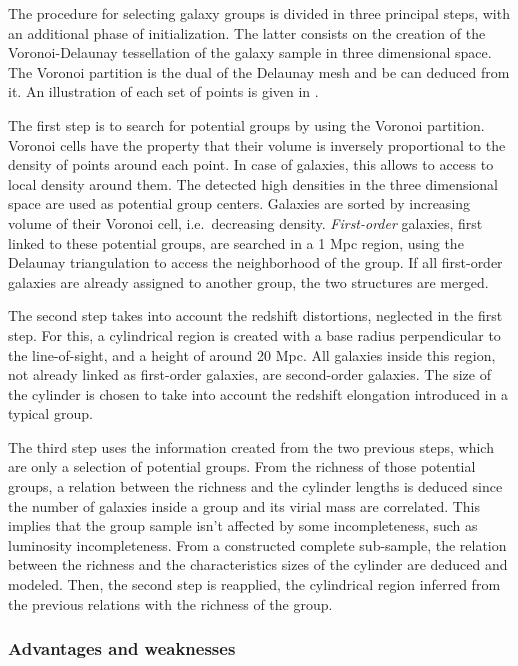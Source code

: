 The procedure for selecting galaxy groups is divided in three principal steps,
with an additional phase of initialization. The latter consists on the creation
of the Voronoi-Delaunay tessellation of the galaxy sample in three dimensional
space. The Voronoi partition is the dual of the Delaunay mesh and be can
deduced from it. An illustration of each set of points is given in
.

The first step is to search for potential groups by using the Voronoi
partition. Voronoi cells have the property that their volume is inversely
proportional to the density of points around each point. In case of galaxies,
this allows to access to local density around them. The detected high densities
in the three dimensional space are used as potential group centers. Galaxies
are sorted by increasing volume of their Voronoi cell, i.e.\ decreasing
density. \emph{First-order} galaxies, first linked to these potential groups,
are searched in a 1 Mpc region, using the Delaunay triangulation to access the
neighborhood of the group. If all first-order galaxies are already assigned to
another group, the two structures are merged.

The second step takes into account the redshift distortions, neglected in the
first step. For this, a cylindrical region is created with a base radius
perpendicular to the line-of-sight, and a height of around 20 Mpc. All galaxies
inside this region, not already linked as first-order galaxies, are
second-order galaxies. The size of the cylinder is chosen to take into account
the redshift elongation introduced in a typical group.

The third step uses the information created from the two previous steps, which
are only a selection of potential groups. From the richness of those potential
groups, a relation between the richness and the cylinder lengths is deduced
since the number of galaxies inside a group and its virial mass are correlated.
This implies that the group sample isn't affected by some incompleteness, such
as luminosity incompleteness. From a constructed complete sub-sample, the
relation between the richness and the characteristics sizes of the cylinder are
deduced and modeled. Then, the second step is reapplied, the cylindrical region
inferred from the previous relations with the richness of the group.

\subsubsection{Advantages and weaknesses}
\label{ssub:advantages}


